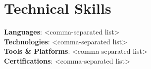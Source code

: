 \section{Technical Skills}
    \begin{itemize}[leftmargin=0.05in, label={}]
	\small{\item{
		\textbf{Languages}{: <comma-separated list>} \\
		\textbf{Technologies}{: <comma-separated list>} \\
		\textbf{Tools \& Platforms}{: <comma-separated list>} \\
		\textbf{Certifications}{: <comma-separated list>}
	}}
    \end{itemize}
